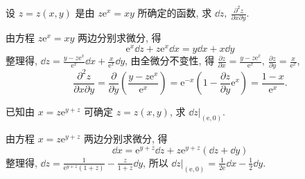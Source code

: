 

\begin{example}
    设 $z=z(x,y)$ 是由 $z\mathrm{e}^x=xy$ 所确定的函数, 求 $\displaystyle\dd z,~\frac{\partial^2z}{\partial x\partial y}.$
\end{example}
\begin{solution}
    由方程 $z\mathrm{e}^x=xy$ 两边分别求微分, 得
    $$\mathrm{e}^x\dd z+z\mathrm{e}^x\dd x=y\dd x+x\dd y$$
    整理得, $\displaystyle\dd z=\frac{y-z\mathrm{e}^x}{\mathrm{e}^x}\dd x+\frac{x}{\mathrm{e}^x}\dd y$, 由全微分不变性, 得 $\displaystyle\frac{\partial z}{\partial x}=\frac{y-z\mathrm{e}^x}{\mathrm{e}^x},~\frac{\partial z}{\partial y}=\frac{x}{\mathrm{e}^x}$,
    $$\frac{\partial^2z}{\partial x\partial y}=\frac{\partial}{\partial y}\left(\frac{y-z\mathrm{e}^x}{\mathrm{e}^x}\right)=\mathrm{e}^{-x}\left(1-\frac{\partial z}{\partial y}\mathrm{e}^x\right)=\frac{1-x}{\mathrm{e}^x}.$$
\end{solution}

\begin{example}[2006 年江苏省高等数学竞赛题]
    已知由 $x=z\mathrm{e}^{y+z}$ 可确定 $z=z(x,y)$, 求 $\dd z|_{(\mathrm{e},0)}.$
\end{example}
\begin{solution}
    由方程 $x=z\mathrm{e}^{y+z}$ 两边分别求微分, 得
    $$\dd x=\mathrm{e}^{y+z}\dd z+z\mathrm{e}^{y+z}(\dd z+\dd y)$$
    整理得, $\displaystyle \dd z=\frac{1}{\mathrm{e}^{y+z}(1+z)}-\frac{z}{1+z}\dd y$, 所以 $\displaystyle\dd z|_{(\mathrm{e,0})}=\frac{1}{2\mathrm{e}}\dd x-\frac{1}{2}\dd y$.
\end{solution}

